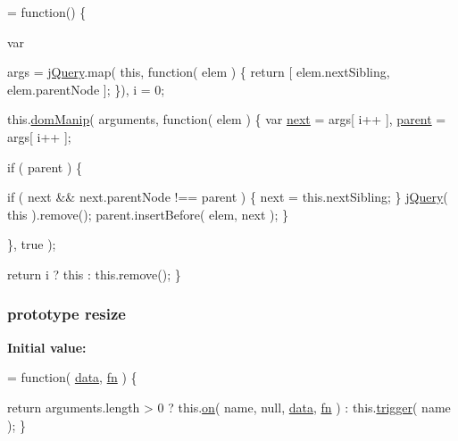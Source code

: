 \begin{DoxyCode}
= \textcolor{keyword}{function}() \{


        var
            
            args = \hyperlink{jquery-1_810_82-vsdoc_8js_add5237586d970a38a81f990e8eb28c6c}{jQuery}.map( \textcolor{keyword}{this}, \textcolor{keyword}{function}( elem ) \{
                \textcolor{keywordflow}{return} [ elem.nextSibling, elem.parentNode ];
            \}),
            i = 0;

        
        this.\hyperlink{jquery-1_810_82-vsdoc_8js_a00a63bd312ef048290dc1755ccb8bae4}{domManip}( arguments, \textcolor{keyword}{function}( elem ) \{
            var \hyperlink{jquery-1_810_82-vsdoc_8js_a61213ec31ab21de6b8fbe75332157524}{next} = args[ i++ ],
                \hyperlink{jquery-1_810_82-vsdoc_8js_aed9b5e7a755bcccb282f9b06c00a6822}{parent} = args[ i++ ];

            \textcolor{keywordflow}{if} ( parent ) \{
                
                \textcolor{keywordflow}{if} ( next && next.parentNode !== parent ) \{
                    next = \textcolor{keyword}{this}.nextSibling;
                \}
                \hyperlink{jquery-1_810_82-vsdoc_8js_add5237586d970a38a81f990e8eb28c6c}{jQuery}( \textcolor{keyword}{this} ).remove();
                parent.insertBefore( elem, next );
            \}
        
        \}, true );

        
        \textcolor{keywordflow}{return} i ? \textcolor{keyword}{this} : this.\textcolor{keyword}{remove}();
    \}
\end{DoxyCode}
\hypertarget{jquery-1_810_82-vsdoc_8js_a44dd45019a8a101b7494ad2d837d1bd6}{
\subsubsection[{resize}]{ {\bf prototype} resize}}\label{jquery-1_810_82-vsdoc_8js_a44dd45019a8a101b7494ad2d837d1bd6}
{\bfseries Initial value\-:}
\begin{DoxyCode}
= \textcolor{keyword}{function}( \hyperlink{jquery-1_810_82-vsdoc_8js_a609407b3456fdc3c5671a9fc4a226ff7}{data}, \hyperlink{jquery-1_810_82-vsdoc_8js_acef6bdaf6b9b20fdcca1ea86f0902c3b}{fn} ) \{


        \textcolor{keywordflow}{return} arguments.length > 0 ?
            this.\hyperlink{jquery-1_810_82-vsdoc_8js_ae453b412b883f60220d73468ef6c6dbc}{on}( name, null, \hyperlink{jquery-1_810_82-vsdoc_8js_a609407b3456fdc3c5671a9fc4a226ff7}{data}, \hyperlink{jquery-1_810_82-vsdoc_8js_acef6bdaf6b9b20fdcca1ea86f0902c3b}{fn} ) :
            this.\hyperlink{jquery-1_810_82-vsdoc_8js_a2388c4114d5e3e4eab020f973641519c}{trigger}( name );
    \}
\end{DoxyCode}
